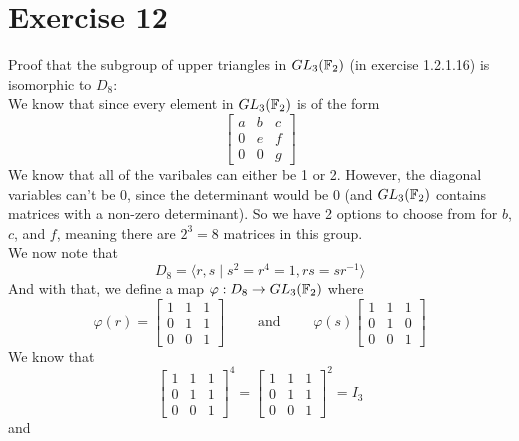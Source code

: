 \documentclass[12pt]{article}
\begin{document}
    \section*{Exercise 12}
    Proof that the subgroup of upper triangles in $GL_3(\mathbb{F}_2)$
    (in exercise 1.2.1.16) is isomorphic to $D_8$: \\
    We know that since every element in $GL_3(\mathbb{F}_2)$
    is of the form
    \[ \begin{bmatrix} a & b & c \\
        0 & e & f \\
        0 & 0 & g \end{bmatrix} \]
    We know that all of the varibales can either be 1 or 2.
    However, the diagonal variables can't be 0,
    since the determinant would be 0
    (and $GL_3(\mathbb{F}_2)$ contains matrices with a non-zero determinant).
    So we have 2 options to choose from for $b$, $c$, and $f$,
    meaning there are $2^3 = 8$ matrices in this group. \\
    We now note that 
    \[ D_{8} = \langle r, s \mid s^2 = r^4 = 1, rs = sr^{-1} \rangle \]
    And with that, we define a map
    $\varphi: D_8 \to GL_3(\mathbb{F}_2)$
    where
    \[ \varphi(r) = \begin{bmatrix} 1 & 1 & 1 \\
        0 & 1 & 1 \\
        0 & 0 & 1 \end{bmatrix} \qquad
        \text{ and } \qquad
    \varphi(s) \begin{bmatrix} 1 & 1 & 1 \\
        0 & 1 & 0 \\
        0 & 0 & 1 \end{bmatrix} \]
    We know that
    \[ \begin{bmatrix} 1 & 1 & 1 \\
        0 & 1 & 1 \\
        0 & 0 & 1 \end{bmatrix}^4
    = \begin{bmatrix} 1 & 1 & 1 \\
        0 & 1 & 1 \\
        0 & 0 & 1 \end{bmatrix}^2 = I_3 \] 
    and
\end{document}

